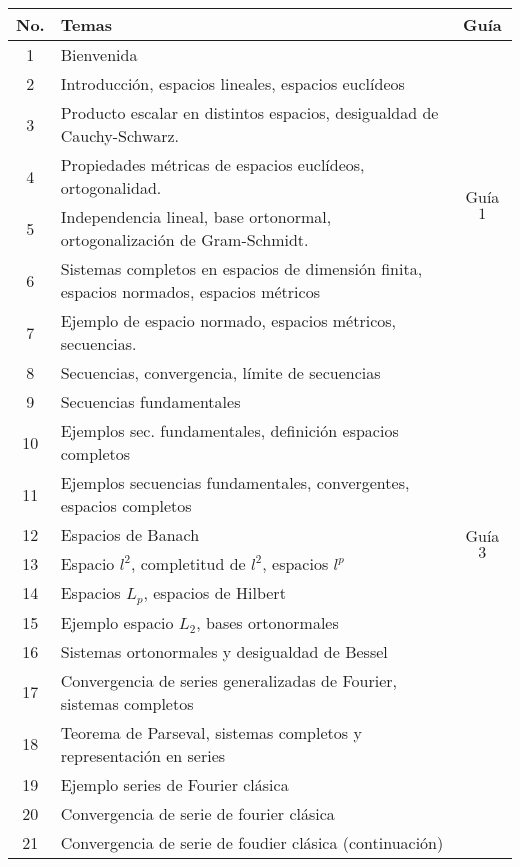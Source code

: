 \vspace{1cm}


\begin{table}[H]
	\centering
	\begin{tabular}{||c|p{13cm}||c||}
		\hline
		\hline
			No. & Temas & Guía \\
		\hline
		\hline
			1  & Bienvenida &  \\
		\hline
			2  & Introducción, espacios lineales, espacios euclídeos &  \\
			3  & Producto escalar en distintos espacios, desigualdad de Cauchy-Schwarz. & \multirow{4}{2cm}{Guía $1$} \\
			4  & Propiedades métricas de espacios euclídeos, ortogonalidad.  &  \\
			5  & Independencia lineal, base ortonormal,  ortogonalización de Gram-Schmidt. &  \\
		\hline
			6  & Sistemas completos en espacios de dimensión finita, espacios normados, espacios métricos & \multirow{4}{2cm}{Guía $2$} \\
			7  & Ejemplo de espacio normado, espacios métricos, secuencias. &  \\
			8  & Secuencias, convergencia, límite de secuencias &  \\
			9  & Secuencias fundamentales &  \\
		\hline
			10 & Ejemplos sec. fundamentales, definición espacios completos & \multirow{7}{2cm}{Guía $3$} \\
			11 & Ejemplos secuencias fundamentales, convergentes, espacios completos &  \\
			12 & Espacios de Banach &  \\
			13 & Espacio $l^2$, completitud de $l^2$, espacios $l^p$ &  \\
			14 & Espacios $L_p$, espacios de Hilbert &  \\
			15 & Ejemplo espacio $L_2$, bases ortonormales &  \\
			16 & Sistemas ortonormales y desigualdad de Bessel &  \\
		\hline
			17 & Convergencia de series generalizadas de Fourier, sistemas completos & \\
			18 & Teorema de Parseval, sistemas completos y representación en series & \\
			19 & Ejemplo series de Fourier clásica & \\
			20 & Convergencia de serie de fourier clásica & \\
			21 & Convergencia de serie de foudier clásica (continuación) & \\
		\hline
		\hline
	\end{tabular}
\end{table}









